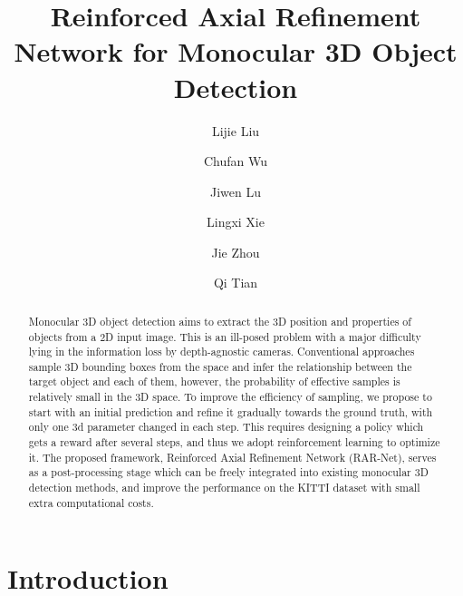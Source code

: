\documentclass[runningheads]{llncs}
\begin{document}
\pagestyle{headings}
\mainmatter
\def\ECCVSubNumber{2822}

\title{Reinforced Axial Refinement Network for Monocular 3D Object Detection}
\author{Lijie Liu \and
Chufan Wu\and
Jiwen Lu\and
Lingxi Xie\and
Jie Zhou\and
Qi Tian}

\maketitle
\begin{abstract}
Monocular 3D object detection aims to extract the 3D position and properties of objects from a 2D input image. This is an ill-posed problem with a major difficulty lying in the information loss by depth-agnostic cameras. Conventional approaches sample 3D bounding boxes from the space and infer the relationship between the target object and each of them, however, the probability of effective samples is relatively small in the 3D space. To improve the efficiency of sampling, we propose to start with an initial prediction and refine it gradually towards the ground truth, with only one 3d parameter changed in each step. This requires designing a policy which gets a reward after several steps, and thus we adopt reinforcement learning to optimize it. The proposed framework, Reinforced Axial Refinement Network (RAR-Net), serves as a post-processing stage which can be freely integrated into existing monocular 3D detection methods, and improve the performance on the KITTI dataset with small extra computational costs.

\end{abstract}
\section{Introduction}
\end{document}
